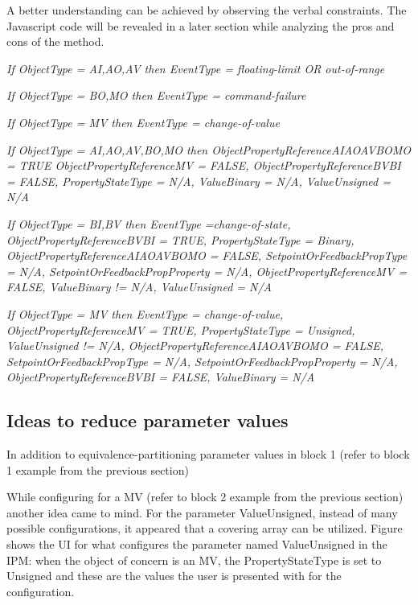 \documentclass[conference]{IEEEtran}
\begin{document}
	
	A better understanding can be achieved by observing the verbal constraints.
	The Javascript code will be revealed in a later section while analyzing the pros and cons of the method. 
		
	\textsl{If ObjectType = AI,AO,AV  then  EventType = floating-limit	OR  out-of-range}
				
	\textsl{If ObjectType = BO,MO then EventType = command-failure	}			
	
	\textsl{If ObjectType = MV then EventType = change-of-value}
	
	\textsl{If ObjectType = AI,AO,AV,BO,MO then ObjectPropertyReferenceAIAOAVBOMO = TRUE
	ObjectPropertyReferenceMV = FALSE, ObjectPropertyReferenceBVBI = FALSE, PropertyStateType = N/A,
	ValueBinary = N/A, ValueUnsigned = N/A	}		
	

	\textsl{If ObjectType = BI,BV then EventType =change-of-state,  ObjectPropertyReferenceBVBI = TRUE,
	PropertyStateType = Binary, ObjectPropertyReferenceAIAOAVBOMO = FALSE, SetpointOrFeedbackPropType = N/A,
	SetpointOrFeedbackPropProperty = N/A, ObjectPropertyReferenceMV = FALSE,  ValueBinary != N/A, ValueUnsigned = N/A} 				
	

	\textsl{If ObjectType = MV then EventType = change-of-value, ObjectPropertyReferenceMV =  TRUE,
	PropertyStateType = Unsigned, ValueUnsigned != N/A, ObjectPropertyReferenceAIAOAVBOMO = FALSE,
	SetpointOrFeedbackPropType = N/A, SetpointOrFeedbackPropProperty = N/A, ObjectPropertyReferenceBVBI = FALSE,
	ValueBinary = N/A}

		
	\subsection{Ideas to reduce parameter values}
	In addition to equivalence-partitioning parameter values in block 1
	(refer to block 1 example from the previous section) 
	
	While configuring for a MV (refer to block 2 example from the previous section) 
	another idea came to mind. For the parameter ValueUnsigned, instead of many possible configurations, 
	it appeared that a covering array can be utilized. 
	Figure shows the UI for what configures the parameter named ValueUnsigned in the IPM: when the object of concern is an MV, 
	the PropertyStateType is set to Unsigned and these are the values the user is presented with for the configuration.	
\end{document}
